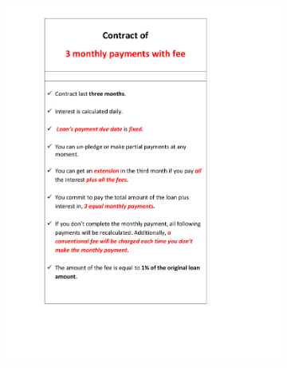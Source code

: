 \documentclass[11pt]{article}
\begin{document}
\begin{figure}[H]
     \caption{Booklet with product information translated}
    \label{booklet_translate2}
    \begin{center}
    \begin{subfigure}{.9\textwidth}
        \centering
        \includegraphics[width=\textwidth]{Figuras/MP_F.pdf}
    \end{subfigure}
    \end{center}
\end{figure}
\end{document}
